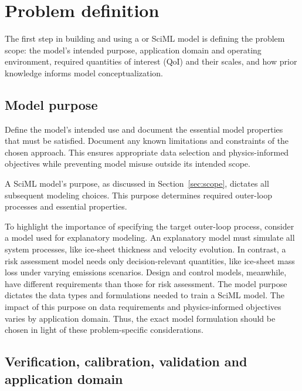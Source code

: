 \section{Problem definition}
\label{sec:problem-def}

The first step in building and using a \CSE{} or SciML model is defining the problem scope: the model's intended purpose, application domain and operating environment, required quantities of interest (QoI) and their scales, and how prior knowledge informs model conceptualization.

\subsection{Model purpose}

\begin{essrec}
Define the model's intended use and document the essential model properties that must be satisfied. Document any known limitations and constraints of the chosen approach. This ensures appropriate data selection and physics-informed objectives while preventing model misuse outside its intended scope.
\end{essrec}

A SciML model's purpose, as discussed in Section~\ref{sec:scope}, dictates all subsequent modeling choices.
This purpose determines required outer-loop processes and essential properties.

To highlight the importance of specifying the target outer-loop process, consider a model used for explanatory modeling. An explanatory model must simulate all system processes, like ice-sheet thickness and velocity evolution. In contrast, a risk assessment model needs only decision-relevant quantities, like ice-sheet mass loss under varying emissions scenarios. Design and control models, meanwhile, have different requirements than those for risk assessment.
The model purpose dictates the data types and formulations needed to train a SciML model. The impact of this purpose on data requirements and physics-informed objectives varies by application domain. Thus, the exact model formulation should be chosen in light of these problem-specific considerations.


\subsection{Verification, calibration, validation and application domain}

